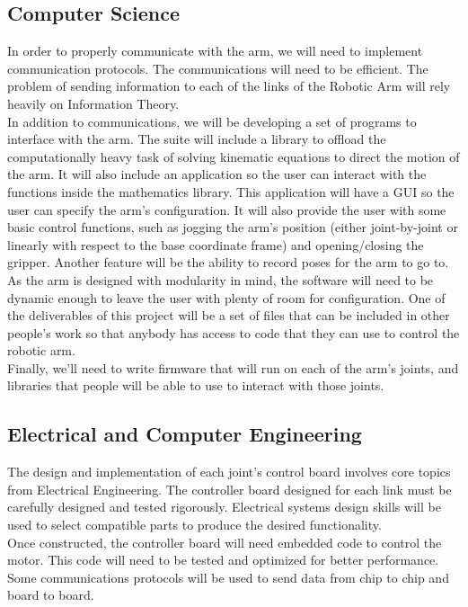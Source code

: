 \subsection{Computer Science}
In order to properly communicate with the arm, we will need to implement communication protocols. The communications will need to be efficient. The problem of sending information to each of the links of the Robotic Arm will rely heavily on Information Theory.\\
\newline
In addition to communications, we will be developing a set of programs to interface with the arm. The suite will include a library to offload the computationally heavy task of solving kinematic equations to direct the motion of the arm. It will also include an application so the user can interact with the functions inside the mathematics library. This application will have a GUI so the user can specify the arm's configuration. It will also provide the user with some basic control functions, such as jogging the arm's position (either joint-by-joint or linearly with respect to the base coordinate frame) and opening/closing the gripper. Another feature will be the ability to record poses for the arm to go to.\\
\newline
As the arm is designed with modularity in mind, the software will need to be dynamic enough to leave the user with plenty of room for configuration. One of the deliverables of this project will be a set of files that can be included in other people's work so that anybody has access to code that they can use to control the robotic arm.\\
\newline
Finally, we'll need to write firmware that will run on each of the arm's joints, and libraries that people will be able to use to interact with those joints. 

\subsection{Electrical and Computer Engineering}
The design and implementation of each joint's control board involves core topics from Electrical Engineering. The controller board designed for each link must be carefully designed and tested rigorously. Electrical systems design skills will be used to select compatible parts to produce the desired functionality. \\
\newline
Once constructed, the controller board will need embedded code to control the motor. This code will need to be tested and optimized for better performance. Some communications protocols will be used to send data from chip to chip and board to board.



